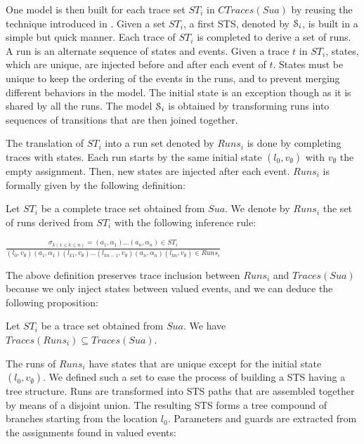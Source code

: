 One model is then built for each trace set $ST_i$ in
$CTraces(Sua)$ by reusing the technique introduced in
. Given a set
$ST_i$, a first STS, denoted by $\EuScript{S}_i$, is built in a
simple but quick manner. Each trace of $ST_i$ is completed to
derive a set of runs. A run is an alternate sequence of states
and events. Given a trace $t$ in $ST_i$, states, which are
unique, are injected before and after each event of $t$. States
must be unique to keep the ordering of the events in the runs,
and to prevent merging different behaviors in the model.  The
initial state is an exception though as it is shared by all the
runs. The model $\EuScript{S}_i$ is obtained by transforming runs
into sequences of transitions that are then joined together.

The translation of $ST_i$ into a run set denoted by $Runs_i$ is done
by completing traces with states. Each run starts by the same
initial state $(l_0,v_\emptyset)$ with $v_\emptyset$ the empty
assignment. Then, new states are injected after each event.
$Runs_i$ is formally given by the following definition:

\begin{definition}
  Let $ST_i$ be a complete trace set obtained from
  $\mathit{Sua}$. We denote by $Runs_i$ the set of runs derived from
  $ST_i$ with the following inference rule:

  \begin{center}
    {\Large
    $\frac{\sigma_{k(1\leq k \leq n)}=(a_1,\alpha_1)...(a_n,\alpha_n) \in ST_i}
    {(l_0,v_\emptyset) (a_1,\alpha_1) (l_{k1},v_\emptyset) \dots (l_{kn-1},v_\emptyset) (a_n,\alpha_n) (l_{kn},v_\emptyset) \in Runs_i}$
    }
  \end{center}
\end{definition}

The above definition preserves trace inclusion between $Runs_i$
and $Traces(Sua)$ because we only inject states between valued
events, and we can deduce the following proposition:

\begin{proposition}
Let $ST_i$ be a trace set obtained from $\mathit{Sua}$. We have
$Traces(Runs_i) \subseteq Traces(Sua)$.
\end{proposition}

The runs of $Runs_i$ have states that are unique except for the
initial state $(l_0,v_\emptyset)$. We defined such a set to
ease the process of building a STS having a tree structure.  Runs
are transformed into STS paths that are assembled together by
means of a disjoint union. The resulting STS forms a tree
compound of branches starting from the location $l_0$. Parameters
and guards are extracted from the assignments found in valued
events:

